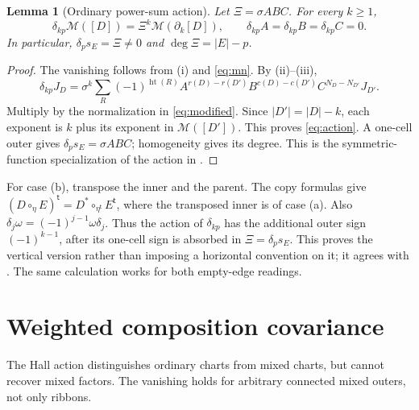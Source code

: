 \documentclass[11pt,a4paper]{amsart}
\numberwithin{equation}{section}
\theoremstyle{plain}
\newtheorem{lemma}[theorem]{Lemma}
\theoremstyle{definition}
\begin{document}
\begin{lemma}[Ordinary power-sum action]\label{lem:action}
Let \(\Xi=\sigma ABC\).  For every \(k\ge1\),
\begin{equation}\label{eq:action}
 \delta_{kp}\mathcal M([D])=\Xi^k\mathcal M(\partial_k[D]),
 \qquad \delta_{kp}A=\delta_{kp}B=\delta_{kp}C=0.
\end{equation}
In particular, \(\delta_p s_E=\Xi\ne0\) and \(\deg\Xi=|E|-p\).
\end{lemma}
\begin{proof}
The vanishing follows from (i) and \eqref{eq:mn}.  By (ii)--(iii),
\begin{equation*}
 \delta_{kp}J_D
 =\sigma^k\sum_R(-1)^{\operatorname{ht}(R)}
 A^{r(D)-r(D')}B^{c(D)-c(D')}C^{N_D-N_{D'}}J_{D'}.
\end{equation*}
Multiply by the normalization in \eqref{eq:modified}.  Since \(|D'|=|D|-k\), each exponent is \(k\) plus its exponent in \(\mathcal M([D'])\).  This proves \eqref{eq:action}.  A one-cell outer gives \(\delta_p s_E=\sigma ABC\); homogeneity gives its degree.  This is the symmetric-function specialization of the action in \cite[Lem.~5.4.7]{OlsonHarris2024HopfApplications}.
\end{proof}

For case (b), transpose the inner and the parent.  The copy formulas give
\((D\circ_\eta E)^{\mathsf t}=D^*\circ_{\eta^{\mathsf t}}E^{\mathsf t}\),
where the transposed inner is of case (a).  Also
\(\delta_j\omega=(-1)^{j-1}\omega\delta_j\).
Thus the action of \(\delta_{kp}\) has the additional outer sign \((-1)^{k-1}\), after its one-cell sign is absorbed in \(\Xi=\delta_p s_E\).  This proves the vertical version rather than imposing a horizontal convention on it; it agrees with \cite[Thm.~5.4.9]{OlsonHarris2024HopfApplications}.  The same calculation works for both empty-edge readings.

\section{Weighted composition covariance}\label{sec:weighted-action}

The Hall action distinguishes ordinary charts from mixed charts, but cannot recover mixed factors.  The vanishing holds for arbitrary connected mixed outers, not only ribbons.
\end{document}
